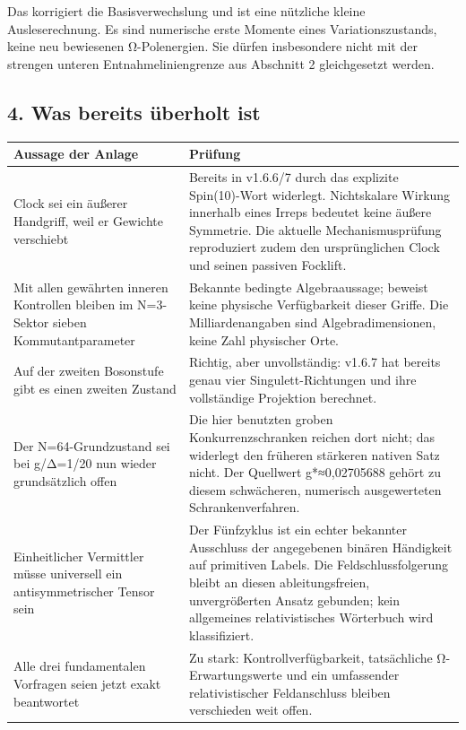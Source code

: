 Das korrigiert die Basisverwechslung und ist eine nützliche kleine
Ausleserechnung. Es sind numerische erste Momente eines
Variationszustands, keine neu bewiesenen Ω-Polenergien. Sie dürfen
insbesondere nicht mit der strengen unteren Entnahmeliniengrenze aus
Abschnitt 2 gleichgesetzt werden.

\subsection{4. Was bereits überholt
ist}\label{was-bereits-uxfcberholt-ist}

{\def\LTcaptype{none} %
\begin{longtable}[]{@{}
  >{\raggedright\arraybackslash}p{}
  >{\raggedright\arraybackslash}p{}@{}}
\toprule\noalign{}
\begin{minipage}[b]{\linewidth}\raggedright
Aussage der Anlage
\end{minipage} & \begin{minipage}[b]{\linewidth}\raggedright
Prüfung
\end{minipage} \\
\midrule\noalign{}
\endhead
\bottomrule\noalign{}
\endlastfoot
Clock sei ein äußerer Handgriff, weil er Gewichte verschiebt & Bereits
in v1.6.6/7 durch das explizite Spin(10)-Wort widerlegt. Nichtskalare
Wirkung innerhalb eines Irreps bedeutet keine äußere Symmetrie. Die
aktuelle Mechanismusprüfung reproduziert zudem den ursprünglichen Clock
und seinen passiven Focklift. \\
Mit allen gewährten inneren Kontrollen bleiben im N=3-Sektor sieben
Kommutantparameter & Bekannte bedingte Algebraaussage; beweist keine
physische Verfügbarkeit dieser Griffe. Die Milliardenangaben sind
Algebradimensionen, keine Zahl physischer Orte. \\
Auf der zweiten Bosonstufe gibt es einen zweiten Zustand & Richtig, aber
unvollständig: v1.6.7 hat bereits genau vier Singulett-Richtungen und
ihre vollständige Projektion berechnet. \\
Der N=64-Grundzustand sei bei g/Δ=1/20 nun wieder grundsätzlich offen &
Die hier benutzten groben Konkurrenzschranken reichen dort nicht; das
widerlegt den früheren stärkeren nativen Satz nicht. Der Quellwert
g*≈0,02705688 gehört zu diesem schwächeren, numerisch ausgewerteten
Schrankenverfahren. \\
Einheitlicher Vermittler müsse universell ein antisymmetrischer Tensor
sein & Der Fünfzyklus ist ein echter bekannter Ausschluss der
angegebenen binären Händigkeit auf primitiven Labels. Die
Feldschlussfolgerung bleibt an diesen ableitungsfreien, unvergrößerten
Ansatz gebunden; kein allgemeines relativistisches Wörterbuch wird
klassifiziert. \\
Alle drei fundamentalen Vorfragen seien jetzt exakt beantwortet & Zu
stark: Kontrollverfügbarkeit, tatsächliche Ω-Erwartungswerte und ein
umfassender relativistischer Feldanschluss bleiben verschieden weit
offen. \\
\end{longtable}
}

